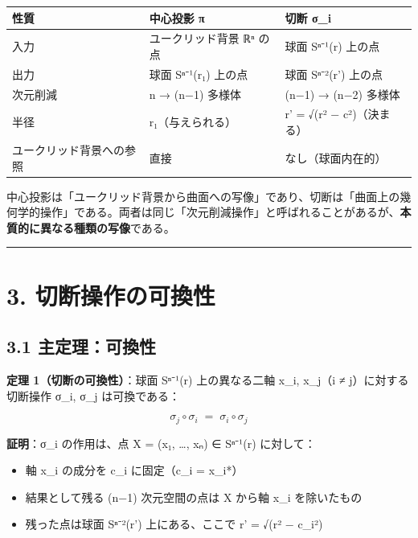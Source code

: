 \documentclass[a4paper,11pt]{ltjsarticle}
\theoremstyle{definition}
\theoremstyle{remark}
\providecommand{\tightlist}{%
  \setlength{\itemsep}{0pt}\setlength{\parskip}{0pt}}
\begin{document}
{\def\LTcaptype{none} %
\begin{longtable}[]{@{}lll@{}}
\toprule\noalign{}
性質 & 中心投影 π & 切断 σ\_i \\
\midrule\noalign{}
\endhead
\bottomrule\noalign{}
\endlastfoot
入力 & ユークリッド背景 ℝⁿ の点 & 球面 Sⁿ⁻¹(r) 上の点 \\
出力 & 球面 Sⁿ⁻¹(r₁) 上の点 & 球面 Sⁿ⁻²(r') 上の点 \\
次元削減 & n → (n−1) 多様体 & (n−1) → (n−2) 多様体 \\
半径 & r₁（与えられる） & r' = √(r² − c²)（決まる） \\
ユークリッド背景への参照 & 直接 & なし（球面内在的） \\
\end{longtable}
}

中心投影は「ユークリッド背景から曲面への写像」であり、切断は「曲面上の幾何学的操作」である。両者は同じ「次元削減操作」と呼ばれることがあるが、\textbf{本質的に異なる種類の写像}である。

\begin{center}\rule{0.5\linewidth}{0.5pt}\end{center}

\section{3.
切断操作の可換性}\label{ux5207ux65adux64cdux4f5cux306eux53efux63dbux6027}

\subsection{3.1
主定理：可換性}\label{ux4e3bux5b9aux7406ux53efux63dbux6027}

\textbf{定理 1（切断の可換性）}：球面 Sⁿ⁻¹(r) 上の異なる二軸 x\_i,
x\_j（i ≠ j）に対する切断操作 σ\_i, σ\_j は可換である：

\[
\sigma_j \circ \sigma_i \;=\; \sigma_i \circ \sigma_j
\]

\textbf{証明}：σ\_i の作用は、点 X = (x₁, \ldots, xₙ) ∈ Sⁿ⁻¹(r)
に対して：

\begin{itemize}
\tightlist
\item
  軸 x\_i の成分を c\_i に固定（c\_i = x\_i*）
\item
  結果として残る (n−1) 次元空間の点は X から軸 x\_i を除いたもの
\item
  残った点は球面 Sⁿ⁻²(r') 上にある、ここで r' = √(r² − c\_i²)
\end{itemize}
\end{document}
